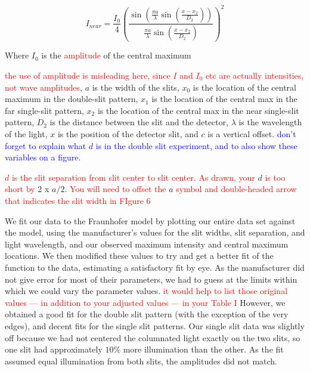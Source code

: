 \documentclass[prb,preprint]{revtex4-1}
\begin{document}
\begin{equation}
I_{near}= \frac{I_{0}}{4}(\frac{\sin(\frac{\pi a}{\lambda}\sin(\frac{x-x_{2}}{D_{2}}))}{\frac{\pi a}{\lambda}\sin(\frac{x-x_{2}}{D_{2}})})^{2} 
\end{equation}

Where $I_0$ is the \textcolor{red}{amplitude} of the central maximum {\textcolor{red}{the use of amplitude is misleading here, since $I$ and $I_0$ etc are actually intensities, not  wave amplitudes}, $a$ is the width of the slits, $x_0$ is the location of the central maximum in the double-slit pattern, $x_1$ is the location of the central max in the far single-slit pattern, $x_2$ is the location of the central max in the near single-slit pattern, $D_2$ is the distance between the slit and the detector, $\lambda$ is the wavelength of the light, $x$ is the position of the detector slit, and $c$ is a vertical offset. \textcolor{blue}{don't forget to explain what $d$ is in the double slit experiment, and to also show these variables on a figure}. 

\textcolor{red}{$d$ is the slit separation from slit center to slit center. As drawn, your }$d$ \textcolor{red}{is too short by} 2 x $a/2$. \textcolor{red}{You will need to offset the} $a$ \textcolor{red}{symbol and double-headed arrow that indicates the slit width in FIgure 6}

We fit our data to the Fraunhofer model by plotting our entire data set against the model, using the manufacturer's values for the slit widths, slit separation, and light wavelength, and our observed maximum intensity and central maximum locations.  We then modified these values to try and get a better fit of the function to the data, estimating a satisfactory fit by eye.  As the manufacturer did not give error for most of their parameters, we had to guess at the limits within which we could vary the parameter values. \textcolor{red}{it would help to list those original values --- in addition to your adjusted values --- in your Table I} However, we obtained a good fit for the double slit pattern (with the exception of the very edges), and decent fits for the single slit patterns.  Our single slit data was slightly off because we had not centered the columnated light exactly on the two slits, so one slit had approximately $10\%$ more illumination than the other.  As the fit assumed equal illumination from both slits, the amplitudes did not match.  

}
\end{document}
